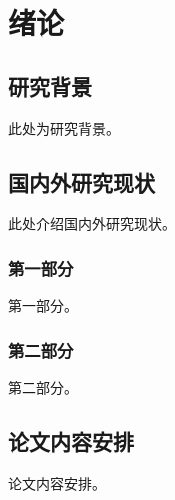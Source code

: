 \chapter{绪论}

\section{研究背景}

此处为研究背景。

\section{国内外研究现状}

此处介绍国内外研究现状。

\subsection{第一部分}

第一部分。 

\subsection{第二部分}

第二部分。

\section{论文内容安排}

论文内容安排。